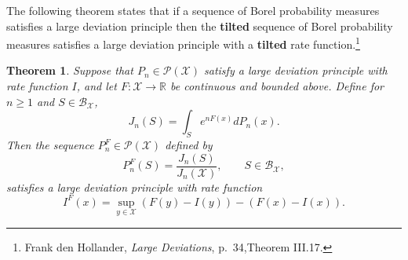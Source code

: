 \documentclass{article}
\newtheorem{theorem}{Theorem}
\theoremstyle{definition}
\begin{document}
The following theorem states that if a sequence of Borel probability measures satisfies a large deviation principle then
the \textbf{tilted} sequence of Borel probability measures satisfies a large deviation principle with a 
\textbf{tilted} rate function.\footnote{Frank
den Hollander, {\em Large Deviations}, p.~34,Theorem III.17.}

\begin{theorem}
Suppose that $P_n \in \mathscr{P}(\mathcal{X})$ satisfy a large deviation principle with rate function
$I$, and let $F:\mathcal{X} \to \mathbb{R}$ be continuous and bounded  above.
Define for $n \geq 1$ and $S \in \mathscr{B}_{\mathcal{X}}$,
\[
J_n(S) = \int_S e^{nF(x)} dP_n(x).
\]
Then the sequence $P_n^F \in \mathscr{P}(\mathcal{X})$ defined by
\[
P_n^F(S) = \frac{J_n(S)}{J_n(\mathcal{X})}, \qquad S \in \mathscr{B}_{\mathcal{X}},
\]
satisfies a large deviation principle with rate function
\[
I^F(x) = \sup_{y \in \mathcal{X}} (F(y)-I(y)) - (F(x)-I(x)).
\]
\end{theorem}
\end{document}
